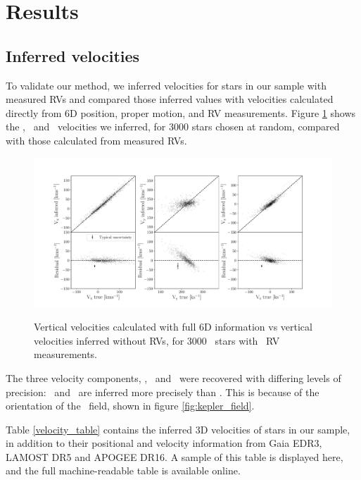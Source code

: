 \section{Results}
\label{sec:results}

\subsection{Inferred velocities}

To validate our method, we inferred velocities for stars in our sample with
measured RVs and compared those inferred values with velocities calculated
directly from 6D position, proper motion, and RV measurements.
Figure \ref{fig:residuals} shows the \vx, \vy\ and \vz\ velocities we
inferred, for 3000 stars chosen at random, compared with those calculated from
measured RVs.
\begin{figure}[ht!]
\caption{Vertical velocities calculated with full 6D information vs vertical
    velocities inferred without RVs, for 3000 \mct\ stars with \gaia\ RV
    measurements.}
  \centering
    \includegraphics[width=1\textwidth]{residuals}
\label{fig:residuals}
\end{figure}

The three velocity components, \vx, \vy\ and \vz\ were recovered with
differing levels of precision: \vx\ and \vz\ are inferred more precisely than
\vy.
This is because of the orientation of the \kepler\ field, shown in figure
\ref{fig:kepler_field}.

Table \ref{velocity_table} contains the inferred 3D velocities of stars in our
sample, in addition to their positional and velocity information from
Gaia EDR3, LAMOST DR5 and APOGEE DR16.
A sample of this table is displayed here, and the full machine-readable table
is available online.
